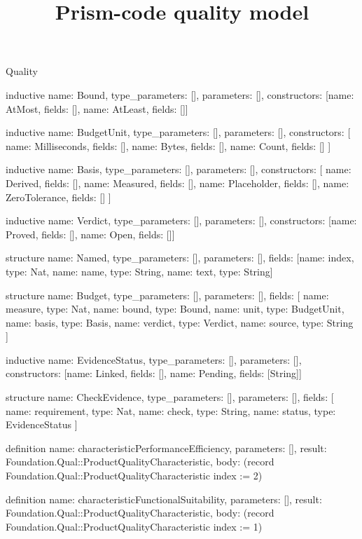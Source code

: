 \begin{lexlean}{Quality}
\title{Prism-code quality model}
\begin{semanticmodule}
inductive{
  name: Bound,
  type_parameters: [],
  parameters: [],
  constructors: [{name: AtMost, fields: []}, {name: AtLeast, fields: []}]
}

inductive{
  name: BudgetUnit,
  type_parameters: [],
  parameters: [],
  constructors: [
    {name: Milliseconds, fields: []},
    {name: Bytes, fields: []},
    {name: Count, fields: []}
  ]
}

inductive{
  name: Basis,
  type_parameters: [],
  parameters: [],
  constructors: [
    {name: Derived, fields: []},
    {name: Measured, fields: []},
    {name: Placeholder, fields: []},
    {name: ZeroTolerance, fields: []}
  ]
}

inductive{
  name: Verdict,
  type_parameters: [],
  parameters: [],
  constructors: [{name: Proved, fields: []}, {name: Open, fields: []}]
}

structure{
  name: Named,
  type_parameters: [],
  parameters: [],
  fields: [{name: index, type: Nat}, {name: name, type: String}, {name: text, type: String}]
}

structure{
  name: Budget,
  type_parameters: [],
  parameters: [],
  fields: [
    {name: measure, type: Nat},
    {name: bound, type: Bound},
    {name: unit, type: BudgetUnit},
    {name: basis, type: Basis},
    {name: verdict, type: Verdict},
    {name: source, type: String}
  ]
}

inductive{
  name: EvidenceStatus,
  type_parameters: [],
  parameters: [],
  constructors: [{name: Linked, fields: []}, {name: Pending, fields: [String]}]
}

structure{
  name: CheckEvidence,
  type_parameters: [],
  parameters: [],
  fields: [
    {name: requirement, type: Nat},
    {name: check, type: String},
    {name: status, type: EvidenceStatus}
  ]
}

definition{
  name: characteristicPerformanceEfficiency,
  parameters: [],
  result: Foundation.Qual::ProductQualityCharacteristic,
  body: (record Foundation.Qual::ProductQualityCharacteristic {index := 2})
}

definition{
  name: characteristicFunctionalSuitability,
  parameters: [],
  result: Foundation.Qual::ProductQualityCharacteristic,
  body: (record Foundation.Qual::ProductQualityCharacteristic {index := 1})
}


\end{semanticmodule}
\end{lexlean}
